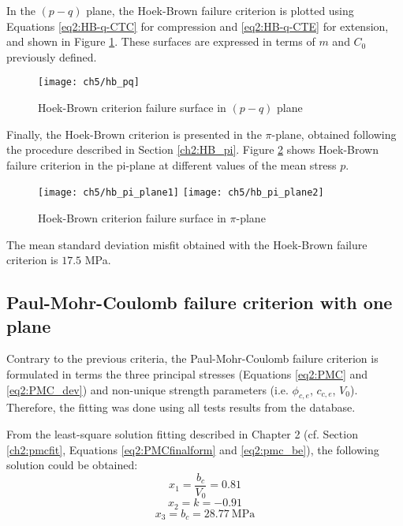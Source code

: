 In the $(p-q)$ plane, the Hoek-Brown failure criterion is plotted using Equations \ref{eq2:HB-q-CTC} for compression and \ref{eq2:HB-q-CTE} for extension, and shown in Figure \ref{fig5:hb_pq}. These surfaces are expressed in terms of $m$ and $C_0$ previously defined. 

\begin{figure}[p]
    \centering
    \texttt{[image: ch5/hb\_pq]}
    \caption{Hoek-Brown criterion failure surface in  $(p-q)$ plane}
    \label{fig5:hb_pq}
\end{figure} 

Finally, the Hoek-Brown criterion is presented in the $\pi$-plane, obtained following the procedure described in Section \ref{ch2:HB_pi}. Figure \ref{fig5:hb_pi_plane} shows Hoek-Brown failure criterion in the pi-plane at different values of the mean stress $p$.

\begin{figure}[tb]
    \centering
    \texttt{[image: ch5/hb\_pi\_plane1]}
    \texttt{[image: ch5/hb\_pi\_plane2]}
    \caption{Hoek-Brown criterion failure surface in  $\pi$-plane}
    \label{fig5:hb_pi_plane}
\end{figure} 

The mean standard deviation misfit obtained with the Hoek-Brown failure criterion is $17.5$ \si{\mega\pascal}. 

\subsection{Paul-Mohr-Coulomb failure criterion with one plane}\label{ch5:3p_pmc}

Contrary to the previous criteria, the Paul-Mohr-Coulomb failure criterion is formulated in terms the three principal stresses (Equations \ref{eq2:PMC} and \ref{eq2:PMC_dev}) and non-unique strength parameters (i.e. $\phi_{c,e}$, $c_{c,e}$, $V_0$). Therefore, the fitting was done using all tests results from the database. 

From the least-square solution fitting described in Chapter 2 (cf. Section \ref{ch2:pmcfit}, Equations \ref{eq2:PMCfinalform} and \ref{eq2:pmc_be}), the following solution could be obtained:
\begin{equation}
    x_1 = \frac{b_c}{V_0} = 0.81
\end{equation}
\begin{equation}
    x_2 = k = -0.91
\end{equation}
\begin{equation}\label{eq5:pmc_bc}
    x_3 = b_c = \SI{28.77}{\mega\pascal}
\end{equation}

